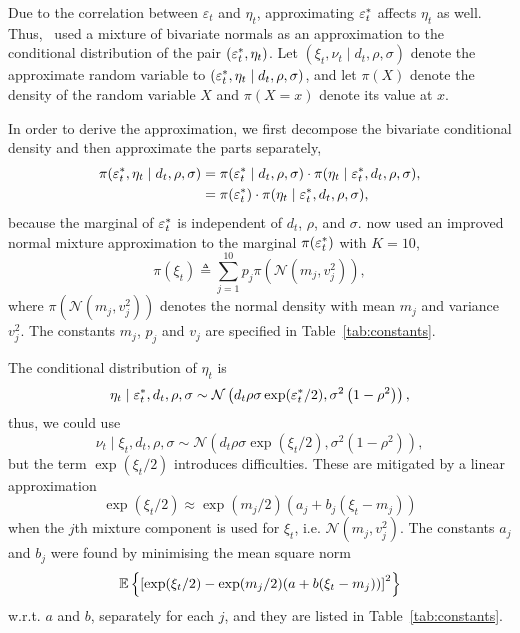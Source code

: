 Due to the correlation between $\varepsilon_t$ and $\eta_t$, approximating $\varepsilon_t^\ast$ affects $\eta_t$ as well.
Thus,~\citeauthor{Omori2007} used a mixture of bivariate normals as an approximation to the conditional distribution of the pair $(\varepsilon_t^\ast, \eta_t)$.
Let $(\xi_t,\nu_t\mid d_t,\rho,\sigma)$ denote the approximate random variable to $(\varepsilon_t^\ast,\eta_t\mid d_t,\rho,\sigma)$, and let $\pi(X)$ denote the density of the random variable $X$ and $\pi(X=x)$ denote its value at $x$.

In order to derive the approximation, we first decompose the bivariate conditional density and then approximate the parts separately,
\begin{align}
\pi(\varepsilon_t^\ast,\eta_t\mid d_t,\rho,\sigma) &= \pi(\varepsilon_t^\ast\mid d_t,\rho,\sigma)\cdot \pi(\eta_t\mid\varepsilon_t^\ast,d_t,\rho,\sigma),\nonumber \\
&= \pi(\varepsilon_t^\ast)\cdot \pi(\eta_t\mid\varepsilon_t^\ast,d_t,\rho,\sigma)\label{eq:decomp},
\end{align}
because the marginal of $\varepsilon_t^\ast$ is independent of $d_t$, $\rho$, and $\sigma$.
\citeauthor{Omori2007} now used an improved normal mixture approximation to the marginal $\pi(\varepsilon_t^\ast)$ with $K=10$,
\begin{equation}\label{eq:ets}
\pi(\xi_t)\triangleq\sum_{j=1}^{10}p_j\pi\left(\mathcal{N}\left(m_j,v_j^2\right)\right),
\end{equation}
where $\pi\left(\mathcal{N}\left(m_j,v_j^2\right)\right)$ denotes the normal density with mean $m_j$ and variance $v_j^2$.
The constants $m_j$, $p_j$ and $v_j$ are specified in Table~\ref{tab:constants}.

The conditional distribution of $\eta_t$ is
\begin{equation*}
\eta_t\mid\varepsilon_t^\ast,d_t,\rho,\sigma\sim\mathcal{N}\left(d_t\rho\sigma\exp(\varepsilon_t^\ast/2),\sigma^2\left(1-\rho^2\right)\right),
\end{equation*}
thus, we could use
\begin{equation}\label{eq:eta}
\nu_t\mid\xi_t,d_t,\rho,\sigma\sim\mathcal{N}\left(d_t\rho\sigma\exp(\xi_t/2),\sigma^2\left(1-\rho^2\right)\right),
\end{equation}
but the term $\exp(\xi_t/2)$ introduces difficulties.
These are mitigated by a linear approximation
\begin{equation}\label{eq:etslinear}
\exp(\xi_t/2)\approx\exp(m_j/2)(a_j+b_j(\xi_t-m_j))
\end{equation}
when the $j$th mixture component is used for $\xi_t$, i.e. $\mathcal{N}(m_j,v_j^2)$.
The constants $a_j$ and $b_j$ were found by minimising the mean square norm 
\begin{equation*}
\mathbb{E}\left\{\left[\exp(\xi_t/2)-\exp(m_j/2)(a+b(\xi_t-m_j))\right]^2\right\}
\end{equation*}
w.r.t. $a$ and $b$, separately for each $j$, and they are listed in Table~\ref{tab:constants}.

